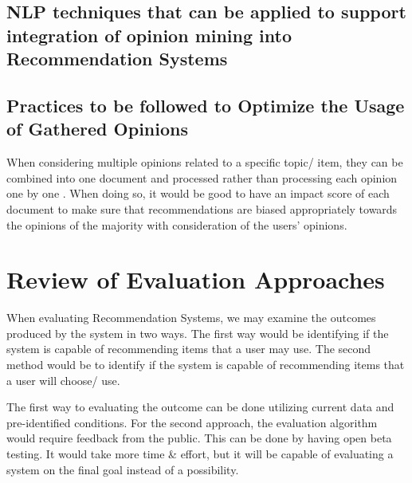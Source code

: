 \subsection{NLP techniques that can be applied to support integration of opinion mining into Recommendation Systems}




\subsection{Practices to be followed to Optimize the Usage of Gathered Opinions}
When considering multiple opinions related to a specific topic/ item, they can be combined into one document and processed rather than processing each opinion one by one \autocite{nah_opinion_2018}. When doing so, it would be good to have an impact score of each document to make sure that recommendations are biased appropriately towards the opinions of the majority with consideration of the users' opinions.



\section{Review of Evaluation Approaches}
When evaluating Recommendation Systems, we may examine the outcomes produced by the system in two ways.
The first way would be identifying if the system is capable of recommending items that a user may use. The second method would be to identify if the system is capable of recommending items that a user will choose/ use.

\bigbreak
The first way to evaluating the outcome can be done utilizing current data and pre-identified conditions. For the second approach, the evaluation algorithm would require feedback from the public. This can be done by having open beta testing. It would take more time \& effort, but it will be capable of evaluating a system on the final goal instead of a possibility.


